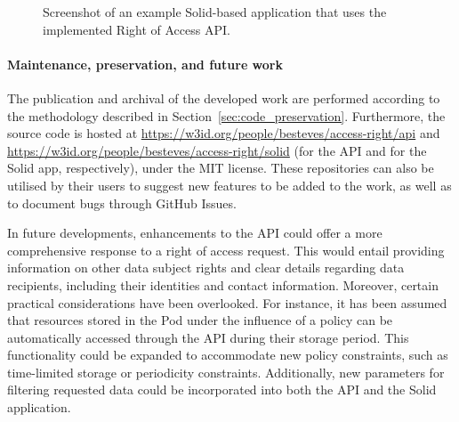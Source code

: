 \begin{figure}[ht]
    \centering
    \caption{Screenshot of an example Solid-based application that uses the implemented Right of Access API.}
    \label{fig:right-app}
\end{figure}

\paragraph{Maintenance, preservation, and future work}
The publication and archival of the developed work are performed according to the methodology described in Section~\ref{sec:code_preservation}.
Furthermore, the source code is hosted at \url{https://w3id.org/people/besteves/access-right/api} and \url{https://w3id.org/people/besteves/access-right/solid} (for the API and for the Solid app, respectively), under the MIT license.
These repositories can also be utilised by their users to suggest new features to be added to the work, as well as to document bugs through GitHub Issues.

In future developments, enhancements to the API could offer a more comprehensive response to a right of access request.
This would entail providing information on other data subject rights and clear details regarding data recipients, including their identities and contact information.
Moreover, certain practical considerations have been overlooked.
For instance, it has been assumed that resources stored in the Pod under the influence of a policy can be automatically accessed through the API during their storage period.
This functionality could be expanded to accommodate new policy constraints, such as time-limited storage or periodicity constraints. 
Additionally, new parameters for filtering requested data could be incorporated into both the API and the Solid application.
